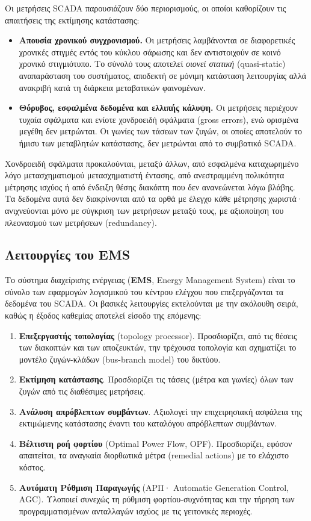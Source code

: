 Οι μετρήσεις SCADA παρουσιάζουν δύο περιορισμούς, οι οποίοι καθορίζουν τις απαιτήσεις της
εκτίμησης κατάστασης:

\begin{itemize}
\item \textbf{Απουσία χρονικού συγχρονισμού.} Οι μετρήσεις λαμβάνονται σε διαφορετικές
      χρονικές στιγμές εντός του κύκλου σάρωσης και δεν αντιστοιχούν σε κοινό χρονικό
      στιγμιότυπο. Το σύνολό τους αποτελεί \emph{οιονεί στατική} (quasi-static)
      αναπαράσταση του συστήματος, αποδεκτή σε μόνιμη κατάσταση λειτουργίας αλλά
      ανακριβή κατά τη διάρκεια μεταβατικών φαινομένων.
\item \textbf{Θόρυβος, εσφαλμένα δεδομένα και ελλιπής κάλυψη.} Οι μετρήσεις περιέχουν
      τυχαία σφάλματα και ενίοτε χονδροειδή σφάλματα (gross errors), ενώ ορισμένα μεγέθη
      δεν μετρώνται. Οι γωνίες των τάσεων των ζυγών, οι οποίες αποτελούν το ήμισυ των
      μεταβλητών κατάστασης, δεν μετρώνται από το συμβατικό SCADA.
\end{itemize}

Χονδροειδή σφάλματα προκαλούνται, μεταξύ άλλων, από εσφαλμένα καταχωρημένο λόγο
μετασχηματισμού μετασχηματιστή έντασης, από ανεστραμμένη πολικότητα μέτρησης ισχύος ή από
ένδειξη θέσης διακόπτη που δεν ανανεώνεται λόγω βλάβης. Τα δεδομένα αυτά δεν διακρίνονται
από τα ορθά με έλεγχο κάθε μέτρησης χωριστά· ανιχνεύονται μόνο με σύγκριση των μετρήσεων
μεταξύ τους, με αξιοποίηση του πλεονασμού των μετρήσεων (redundancy).

\subsection{Λειτουργίες του EMS}

Το σύστημα διαχείρισης ενέργειας (\textbf{EMS}, Energy Management System) είναι το σύνολο των
εφαρμογών λογισμικού του κέντρου ελέγχου που επεξεργάζονται τα δεδομένα του SCADA. Οι
βασικές λειτουργίες εκτελούνται με την ακόλουθη σειρά, καθώς η έξοδος καθεμίας αποτελεί
είσοδο της επόμενης:

\begin{enumerate}
\item \textbf{Επεξεργαστής τοπολογίας} (topology processor). Προσδιορίζει, από τις θέσεις
      των διακοπτών και των αποζευκτών, την τρέχουσα τοπολογία και σχηματίζει το μοντέλο
      ζυγών-κλάδων (bus-branch model) του δικτύου.
\item \textbf{Εκτίμηση κατάστασης}. Προσδιορίζει τις τάσεις (μέτρα και γωνίες) όλων των
      ζυγών από τις διαθέσιμες μετρήσεις.
\item \textbf{Ανάλυση απρόβλεπτων συμβάντων}. Αξιολογεί την επιχειρησιακή ασφάλεια της
      εκτιμώμενης κατάστασης έναντι του καταλόγου απρόβλεπτων συμβάντων.
\item \textbf{Βέλτιστη ροή φορτίου} (Optimal Power Flow, OPF). Προσδιορίζει, εφόσον
      απαιτείται, τα αναγκαία διορθωτικά μέτρα (remedial actions) με το ελάχιστο κόστος.
\item \textbf{Αυτόματη Ρύθμιση Παραγωγής} (ΑΡΠ· Automatic Generation Control, AGC).
      Υλοποιεί συνεχώς τη ρύθμιση φορτίου-συχνότητας και την τήρηση των προγραμματισμένων
      ανταλλαγών ισχύος με τις γειτονικές περιοχές.
\end{enumerate}

